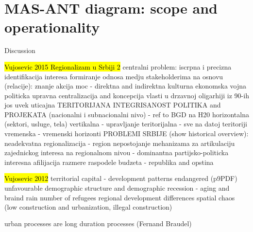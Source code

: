 \documentclass[11pt]{report}
\begin{document}
\section{MAS-ANT diagram: scope and operationality}

Discussion

\hl{Vujosevic 2015 Regionalizam u Srbiji 2}
centralni problem: iscrpna i precizna identifikacija interesa
formiranje odnosa medju stakeholderima na osnovu (relacije):
    znanje
    akcija
    moc - direktna and indirektna
        kulturna
        ekonomska
        vojna
        politicka
upravna centralizacija and koncepcija vlasti u drzavnoj oligarhiji iz 90-ih jos uvek uticajna
TERITORIJANA INTEGRISANOST POLITIKA and PROJEKATA (nacionalni i subnacionalni nivo) - ref to BGD na H20
    horizontalna (sektori, usluge, tela)
    vertikalna - upravljanje
    teritorijalna - sve na datoj teritoriji
    vremenska - vremenski horizonti
PROBLEMI SRBIJE (show historical overview):
    neadekvatna regionalizacija  - region
    nepostojanje mehanizama za artikulaciju zajednickog interesa na regionalnom nivou - dominantna partijsko-politicka interesna afilijacija
    razmere raspodele budzeta - republika and opstina

\hl{Vujosevic 2012}
territorial capital - development patterns endangered  (p9PDF)
    unfavourable demographic structure and demographic recession - aging and braind rain
    number of refugees
    regional development differences
    spatial chaos (low construction and urbanization, illegal construction)
    
urban processes are long duration processes (Fernand Braudel)
\end{document}
